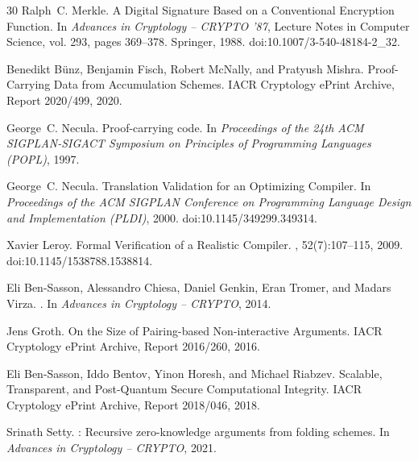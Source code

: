 \documentclass[11pt]{article}
\begin{document}
\begin{thebibliography}{30}
Ralph~C. Merkle.
\newblock A Digital Signature Based on a Conventional Encryption Function.
\newblock In {\em Advances in Cryptology -- CRYPTO '87}, Lecture Notes in Computer Science, vol. 293, pages 369--378. Springer, 1988.
\newblock doi:10.1007/3-540-48184-2\_32.

Benedikt B{\"u}nz, Benjamin Fisch, Robert McNally, and Pratyush Mishra.
\newblock Proof-Carrying Data from Accumulation Schemes.
\newblock IACR Cryptology ePrint Archive, Report 2020/499, 2020.

George~C. Necula.
\newblock Proof-carrying code.
\newblock In {\em Proceedings of the 24th ACM SIGPLAN-SIGACT Symposium on
  Principles of Programming Languages (POPL)}, 1997.

George~C. Necula.
\newblock Translation Validation for an Optimizing Compiler.
\newblock In {\em Proceedings of the ACM SIGPLAN Conference on Programming Language Design and Implementation (PLDI)}, 2000.
\newblock doi:10.1145/349299.349314.

Xavier Leroy.
\newblock Formal Verification of a Realistic Compiler.
, 52(7):107--115, 2009.
\newblock doi:10.1145/1538788.1538814.

Eli Ben-Sasson, Alessandro Chiesa, Daniel Genkin, Eran Tromer, and Madars Virza.
.
\newblock In {\em Advances in Cryptology -- CRYPTO}, 2014.

Jens Groth.
\newblock On the Size of Pairing-based Non-interactive Arguments.
\newblock IACR Cryptology ePrint Archive, Report 2016/260, 2016.

Eli Ben-Sasson, Iddo Bentov, Yinon Horesh, and Michael Riabzev.
\newblock Scalable, Transparent, and Post-Quantum Secure Computational Integrity.
\newblock IACR Cryptology ePrint Archive, Report 2018/046, 2018.

Srinath Setty.
: Recursive zero-knowledge arguments from folding schemes.
\newblock In {\em Advances in Cryptology -- CRYPTO}, 2021.

\end{thebibliography}
\end{document}
